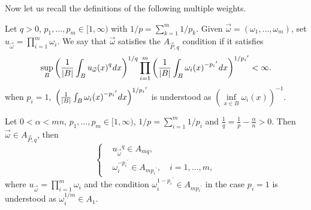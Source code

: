 \documentclass[11pt, twoside, leqno]{article}
\begin{document}
Now let us recall the definitions of the following multiple weights. 
\begin{defn}
	Let $q>0$, $p_1,\ldots,p_m\in[1,\infty)$ with $1/p=\sum_{k=1}^m 1/{p_k}$. Given $\vec{\omega}=(\omega_1,\ldots,\omega_m)$, set $u_{\vec{\omega}}=\prod_{i=1}^m \omega_i$. We say that $\vec{\omega}$ satisfies the $A_{\vec{P},q}$ condition if it satisfies
	\begin{equation}
	\mathop {\sup }\limits_B {\left( {\frac{1}{{|B|}}\int_B {{u _{\vec \omega }}} {{(x)}^q}{\mkern 1mu} dx} \right)^{1/q}}\prod\limits_{i = 1}^m {{{\left( {\frac{1}{{|B|}}\int_B {{\omega _i}} {{(x)}^{ - {{{p_i}^\prime }}}}{\mkern 1mu} dx} \right)}^{1/{{{p_i}^\prime }}}}}  < \infty.
	\end{equation}
	when $p_i=1,$ ${\left( {\frac{1}{{|B|}}\int_B {{\omega _i}} {{(x)}^{ - {{p_i}^\prime }}}{\mkern 1mu} dx} \right)^{1/{{p_i}^\prime }}}$ is understood as ${(\mathop {\inf }\limits_{x \in B} {\omega _i}(x))^{ - 1}}$.
\end{defn}

\begin{lem}\label{lem4}
	Let $0 < \alpha  < mn$, $p_1,\ldots,p_m\in[1,\infty)$, $1/p=\sum_{i=1}^m 1/{p_i}$ and $\frac{1}{q} = \frac{1}{p} - \frac{\alpha }{n}>0$. Then $\vec{\omega}\in A_{\vec{P},q}$, then
	\begin{equation}\label{multi2}
	\left\{
	\begin{aligned}
	&{u_{\vec{\omega}}}^q \in A_{mq},\\
	&\omega_i^{-{{p_i}^\prime }}\in A_{m{{p_i}^\prime }},\quad i=1,\ldots,m,
	\end{aligned}\right.
	\end{equation}
	where $u_{\vec{\omega}}=\prod_{i=1}^m \omega_i$ and the condition $\omega_i^{1-{{p_i}^\prime }}\in A_{m{{p_i}^\prime }}$ in the case $p_i=1$ is understood as $\omega_i^{1/m}\in A_1$.
\end{lem}
\end{document}
